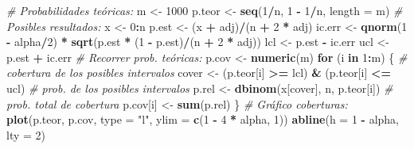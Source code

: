 \documentclass[]{book}
\newenvironment{Shaded}{\begin{snugshade}}{\end{snugshade}}
\newcommand{\KeywordTok}[1]{\textcolor[rgb]{0.13,0.29,0.53}{\textbf{#1}}}
\newcommand{\DataTypeTok}[1]{\textcolor[rgb]{0.13,0.29,0.53}{#1}}
\newcommand{\DecValTok}[1]{\textcolor[rgb]{0.00,0.00,0.81}{#1}}
\newcommand{\StringTok}[1]{\textcolor[rgb]{0.31,0.60,0.02}{#1}}
\newcommand{\CommentTok}[1]{\textcolor[rgb]{0.56,0.35,0.01}{\textit{#1}}}
\newcommand{\ControlFlowTok}[1]{\textcolor[rgb]{0.13,0.29,0.53}{\textbf{#1}}}
\newcommand{\OperatorTok}[1]{\textcolor[rgb]{0.81,0.36,0.00}{\textbf{#1}}}
\newcommand{\NormalTok}[1]{#1}
\theoremstyle{definition}
\theoremstyle{definition}
\theoremstyle{definition}
\theoremstyle{remark}
\begin{document}
\begin{enumerate}
\begin{Shaded}
\begin{Highlighting}[]
\CommentTok{# Probabilidades teóricas:}
\NormalTok{m <-}\StringTok{ }\DecValTok{1000}
\NormalTok{p.teor <-}\StringTok{ }\KeywordTok{seq}\NormalTok{(}\DecValTok{1}\OperatorTok{/}\NormalTok{n, }\DecValTok{1} \OperatorTok{-}\StringTok{ }\DecValTok{1}\OperatorTok{/}\NormalTok{n, }\DataTypeTok{length =}\NormalTok{ m) }
\CommentTok{# Posibles resultados:}
\NormalTok{x <-}\StringTok{ }\DecValTok{0}\OperatorTok{:}\NormalTok{n}
\NormalTok{p.est <-}\StringTok{ }\NormalTok{(x }\OperatorTok{+}\StringTok{ }\NormalTok{adj)}\OperatorTok{/}\NormalTok{(n }\OperatorTok{+}\StringTok{ }\DecValTok{2} \OperatorTok{*}\StringTok{ }\NormalTok{adj) }
\NormalTok{ic.err <-}\StringTok{ }\KeywordTok{qnorm}\NormalTok{(}\DecValTok{1} \OperatorTok{-}\StringTok{ }\NormalTok{alpha}\OperatorTok{/}\DecValTok{2}\NormalTok{) }\OperatorTok{*}\StringTok{ }\KeywordTok{sqrt}\NormalTok{(p.est }\OperatorTok{*}\StringTok{ }\NormalTok{(}\DecValTok{1} \OperatorTok{-}\StringTok{ }\NormalTok{p.est)}\OperatorTok{/}\NormalTok{(n }\OperatorTok{+}\StringTok{ }\DecValTok{2} \OperatorTok{*}\StringTok{ }\NormalTok{adj))  }
\NormalTok{lcl <-}\StringTok{ }\NormalTok{p.est }\OperatorTok{-}\StringTok{ }\NormalTok{ic.err }
\NormalTok{ucl <-}\StringTok{ }\NormalTok{p.est }\OperatorTok{+}\StringTok{ }\NormalTok{ic.err }
\CommentTok{# Recorrer prob. teóricas:}
\NormalTok{p.cov <-}\StringTok{ }\KeywordTok{numeric}\NormalTok{(m)}
\ControlFlowTok{for}\NormalTok{ (i }\ControlFlowTok{in} \DecValTok{1}\OperatorTok{:}\NormalTok{m) \{}
  \CommentTok{# cobertura de los posibles intervalos}
\NormalTok{  cover <-}\StringTok{ }\NormalTok{(p.teor[i] }\OperatorTok{>=}\StringTok{ }\NormalTok{lcl) }\OperatorTok{&}\StringTok{ }\NormalTok{(p.teor[i] }\OperatorTok{<=}\StringTok{ }\NormalTok{ucl)  }
  \CommentTok{# prob. de los posibles intervalos}
\NormalTok{  p.rel <-}\StringTok{ }\KeywordTok{dbinom}\NormalTok{(x[cover], n, p.teor[i])           }
  \CommentTok{# prob. total de cobertura}
\NormalTok{  p.cov[i] <-}\StringTok{ }\KeywordTok{sum}\NormalTok{(p.rel)                            }
\NormalTok{\}}
\CommentTok{# Gráfico coberturas:}
\KeywordTok{plot}\NormalTok{(p.teor, p.cov, }\DataTypeTok{type =} \StringTok{"l"}\NormalTok{, }\DataTypeTok{ylim =} \KeywordTok{c}\NormalTok{(}\DecValTok{1} \OperatorTok{-}\StringTok{ }\DecValTok{4} \OperatorTok{*}\StringTok{ }\NormalTok{alpha, }\DecValTok{1}\NormalTok{))}
\KeywordTok{abline}\NormalTok{(}\DataTypeTok{h =} \DecValTok{1} \OperatorTok{-}\StringTok{ }\NormalTok{alpha, }\DataTypeTok{lty =} \DecValTok{2}\NormalTok{) }
\end{Highlighting}
\end{Shaded}


\end{enumerate}
\end{document}
